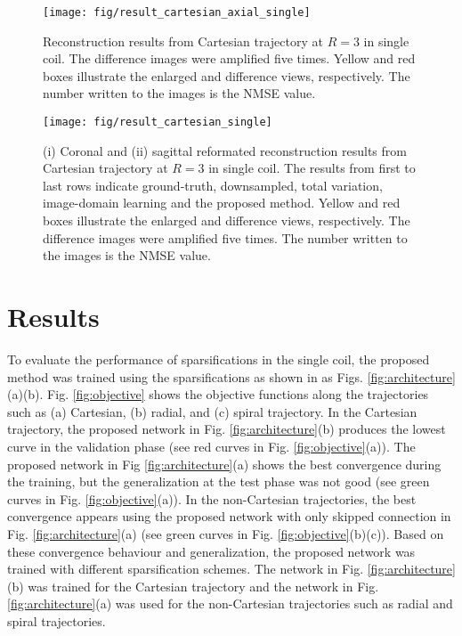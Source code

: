 \documentclass[10pt,journal]{IEEEtran}
\newcommand{\0}{{\boldsymbol{0}}}
\begin{document}
\begin{figure}[!ht] 	
\centerline{\texttt{[image: fig/result\_cartesian\_axial\_single]}}
\caption{Reconstruction results from Cartesian trajectory at $R=3$ in single coil.
The difference images were amplified five times. Yellow and red boxes illustrate the enlarged and difference views, respectively. The number written to the images is the NMSE value.}
\label{fig:result_cartesian_axial_single}
\end{figure}

 \begin{figure}[!hbt] 	
\centerline
{\texttt{[image: fig/result\_cartesian\_single]}}
\caption{(i) Coronal and (ii) sagittal reformated reconstruction results from Cartesian trajectory at $R=3$ in single coil. The results from first to last rows indicate ground-truth, downsampled, total variation, image-domain learning and the proposed method. Yellow and red boxes illustrate the enlarged and difference views, respectively. The difference images were amplified five times. The number written to the images is the NMSE value. }
\label{fig:result_cartesian_single}
\end{figure}



 \section{Results}\label{sec:result}
 

To evaluate the performance of sparsifications  in the single coil, the proposed method was trained using the sparsifications as shown in as Figs. \ref{fig:architecture}(a)(b). Fig. \ref{fig:objective} shows the objective functions along the trajectories such as (a) Cartesian, (b) radial, and (c) spiral trajectory. In the Cartesian trajectory, the proposed network in Fig. \ref{fig:architecture}(b) produces the lowest curve in the validation phase (see red curves in Fig. \ref{fig:objective}(a)). The proposed network in Fig \ref{fig:architecture}(a) shows the best convergence during
the training, but the generalization at the test phase was not good (see green curves in Fig. \ref{fig:objective}(a)). In the non-Cartesian trajectories, the best convergence appears using the proposed network with only skipped connection in Fig. \ref{fig:architecture}(a) (see green curves in Fig. \ref{fig:objective}(b)(c)). 
Based on these convergence behaviour and generalization, the proposed network was trained with different sparsification schemes. The network in Fig. \ref{fig:architecture}(b) was trained for the Cartesian trajectory and the network in Fig. \ref{fig:architecture}(a) was used for the non-Cartesian trajectories such as radial and spiral trajectories.
\end{document}
